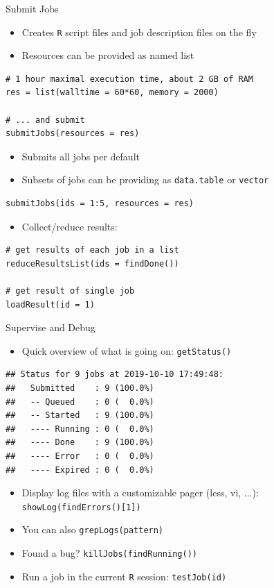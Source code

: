 \documentclass[10pt,compress,t,notes=noshow, xcolor=table]{beamer}
\begin{document}
\begin{frame}[fragile]{Submit Jobs}
  \begin{itemize}
    \item Creates \texttt{R} script files and job description files on the fly
    \item Resources can be provided as named list
  \end{itemize}
  
\begin{lstlisting}
# 1 hour maximal execution time, about 2 GB of RAM
res = list(walltime = 60*60, memory = 2000)

# ... and submit
submitJobs(resources = res)
\end{lstlisting}
  
  \begin{itemize}
    \item Submits all jobs per default
    \item Subsets of jobs can be providing as \texttt{data.table} or \texttt{vector}
  \end{itemize}
  
\begin{lstlisting}
submitJobs(ids = 1:5, resources = res)
\end{lstlisting}

\begin{itemize}
\item Collect/reduce results:
\end{itemize}
\begin{lstlisting}
# get results of each job in a list
reduceResultsList(ids = findDone())

# get result of single job
loadResult(id = 1)
\end{lstlisting}
\end{frame}


\begin{frame}[fragile]{Supervise and Debug}
  \begin{itemize}
    \item Quick overview of what is going on: \texttt{getStatus()}
  \end{itemize}
\begin{lstlisting}
## Status for 9 jobs at 2019-10-10 17:49:48:
##   Submitted    : 9 (100.0%)
##   -- Queued    : 0 (  0.0%)
##   -- Started   : 9 (100.0%)
##   ---- Running : 0 (  0.0%)
##   ---- Done    : 9 (100.0%)
##   ---- Error   : 0 (  0.0%)
##   ---- Expired : 0 (  0.0%)
\end{lstlisting}
  
  \begin{itemize}
    \item Display log files with a customizable pager (less, vi, ...): \texttt{showLog(findErrors()[1])}
    \item You can also \texttt{grepLogs(pattern)}
    \item Found a bug? \texttt{killJobs(findRunning())}
    \item Run a job in the current \texttt{R} session: \texttt{testJob(id)}
  \end{itemize}
\end{frame}
\end{document}
